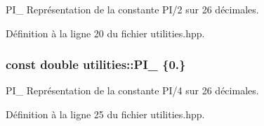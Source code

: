 P\+I\+\_ Représentation de la constante P\+I/2 sur 26 décimales. 



Définition à la ligne 20 du fichier utilities.\+hpp.

\hypertarget{namespaceutilities_a80f229b486391f3a0a17af9cba52fe6d}{}
\subsubsection[{P\+I\+\_\+4}]{\setlength{\rightskip}{0pt plus 5cm}const double utilities\+::\+P\+I\+\_ \{0.\}}\label{namespaceutilities_a80f229b486391f3a0a17af9cba52fe6d}


P\+I\+\_ Représentation de la constante P\+I/4 sur 26 décimales. 



Définition à la ligne 25 du fichier utilities.\+hpp.

